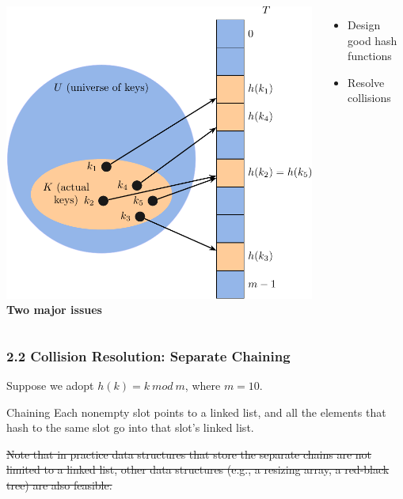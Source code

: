 \documentclass[aspectratio=169, 14pt]{beamer}
\begin{document}
\begin{frame}
\begin{columns}
    \includegraphics[width=.95\textwidth]{week11/table}
     \textbf{Two major issues}
    \begin{itemize}
        \item Design good hash functions
        \item Resolve collisions
    \end{itemize}
\end{columns}


\end{frame}

\begin{frame}
    \frametitle{2.2 Collision Resolution: Separate Chaining}
Suppose we adopt $h(k) = k \ mod \ m$, where $m = 10$. 

\begin{exampleblock}{Chaining}
    Each nonempty slot points to a linked list, and all the elements that hash to the same slot go into that slot's linked list.
\end{exampleblock} 
    
\sout{Note that in practice data structures that store the separate chains are not limited to a linked list, other data structures (e.g., a resizing array, a red-black tree) are also feasible.}
\end{frame}
\end{document}
